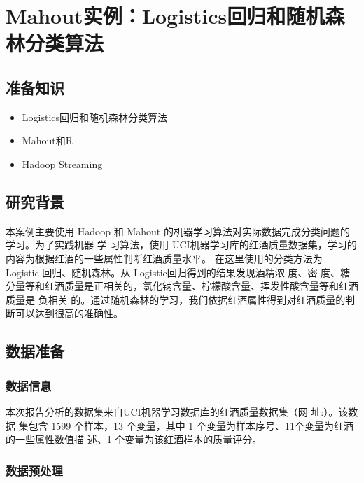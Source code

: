 \section{Mahout实例：Logistics回归和随机森林分类算法}\label{ux5b9eux4f8bux5206ux6790mahout-ux673aux5668ux5b66ux4e60ux7814ux7a76ux7ea2ux9152ux8d28ux91cfux5f71ux54cdux56e0ux7d20}

\subsection{准备知识}\label{ux51c6ux5907ux77e5ux8bc6}

\begin{itemize}
\itemsep1pt\parskip0pt
\item
  Logistics回归和随机森林分类算法
\item
  Mahout和R
\item
  Hadoop Streaming
\end{itemize}

\subsection{研究背景}\label{ux7814ux7a76ux80ccux666f}

本案例主要使用 Hadoop 和 Mahout 的机器学习算法对实际数据完成分类问题的学习。为了实践机器 学
习算法，使用 UCI机器学习库的红酒质量数据集，学习的内容为根据红酒的一些属性判断红酒质量水平。
在这里使用的分类方法为 Logistic 回归、随机森林。从 Logistic回归得到的结果发现酒精浓 度、密
度、糖分量等和红酒质量是正相关的，氯化钠含量、柠檬酸含量、挥发性酸含量等和红酒质量是 负相关
的。通过随机森林的学习，我们依据红酒属性得到对红酒质量的判断可以达到很高的准确性。

\subsection{数据准备}\label{ux6570ux636eux51c6ux5907}

\subsubsection{数据信息}\label{ux6570ux636eux4fe1ux606f}

本次报告分析的数据集来自UCI机器学习数据库的红酒质量数据集（网
址:）。该数据
集包含 1599 个样本，13 个变量，其中 1 个变量为样本序号、11个变量为红酒的一些属性数值描
述、1 个变量为该红酒样本的质量评分。

\subsubsection{数据预处理}\label{ux6570ux636eux9884ux5904ux7406}

